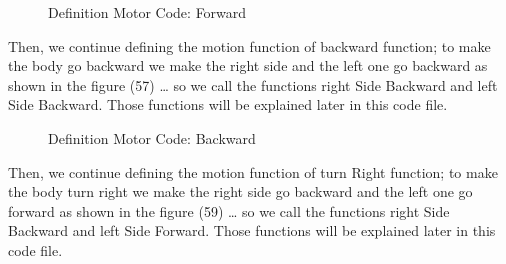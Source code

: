 \documentclass{article}
\begin{document}
\begin{figure}[h]
  \centering
  \hfill
  \caption{Definition Motor Code: Forward}
\end{figure}

Then, we continue defining the motion function of backward function; to make the body go backward we make the right side and the left one go backward as shown in the figure (57) … so we call the functions right Side Backward and left Side Backward. Those functions will be explained later in this code file.

\begin{figure}[h]
  \centering
  \hfill
  \caption{Definition Motor Code: Backward}
\end{figure}

\newpage

Then, we continue defining the motion function of turn Right function; to make the body turn right we make the right side go backward and the left one go forward as shown in the figure (59) … so we call the functions right Side Backward and left Side Forward. Those functions will be explained later in this code file.
\end{document}
